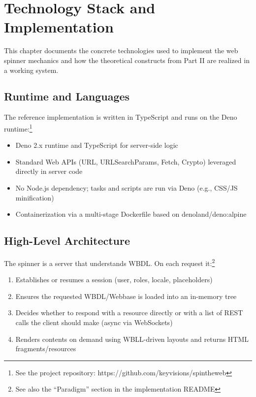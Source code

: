 \chapter{Technology Stack and Implementation}
\label{chap:implementation-tech}

This chapter documents the concrete technologies used to implement the web spinner mechanics and how the theoretical constructs from Part II are realized in a working system.

\section{Runtime and Languages}
The reference implementation is written in TypeScript and runs on the Deno runtime:\footnote{See the project repository: https://github.com/keyvisions/spintheweb}
\begin{itemize}
	\item Deno 2.x runtime and TypeScript for server-side logic
	\item Standard Web APIs (URL, URLSearchParams, Fetch, Crypto) leveraged directly in server code
	\item No Node.js dependency; tasks and scripts are run via Deno (e.g., CSS/JS minification)
	\item Containerization via a multi-stage Dockerfile based on denoland/deno:alpine
\end{itemize}

\section{High-Level Architecture}
The spinner is a server that understands WBDL. On each request it:\footnote{See also the ``Paradigm'' section in the implementation README}
\begin{enumerate}
	\item Establishes or resumes a session (user, roles, locale, placeholders)
	\item Ensures the requested WBDL/Webbase is loaded into an in-memory tree
	\item Decides whether to respond with a resource directly or with a list of REST calls the client should make (async via WebSockets)
	\item Renders contents on demand using WBLL-driven layouts and returns HTML fragments/resources
\end{enumerate}

